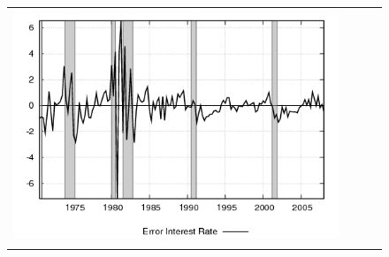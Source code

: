 \begin{figure}
\begin{tabular}{cccc}
\includegraphics[scale=0.22]{results_re/fedfunds_err.png} \\ \\ 
 

\end{tabular}
\end{figure}
